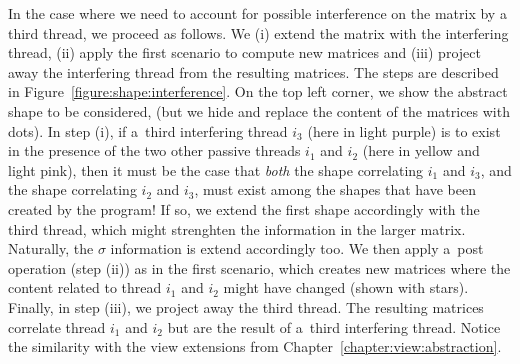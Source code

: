 %
%
%
In the case where we need to account for possible interference on the
matrix by a third thread, we proceed as follows.
%
We %
(i) extend the matrix with the interfering thread, %
(ii) apply the first scenario to compute new matrices and %
(iii) project away the interfering thread from the resulting matrices.
%
The steps are described in Figure~\ref{figure:shape:interference}.
%
On the top left corner, we show the abstract shape to be considered,
(but we hide and replace the content of the matrices with dots).
%
%
In step (i), if a~third interfering thread $i_3$ (here in light
purple) is to exist in the presence of the two other passive threads
$i_1$ and $i_2$ (here in yellow and light pink), then it must be the
case that \emph{both} the shape correlating $i_1$ and $i_3$, and the
shape correlating $i_2$ and $i_3$, must exist among the shapes that
have been created by the program!
%
If so, we extend the first shape accordingly with the third thread,
which might strenghten the information in the larger matrix.
%
Naturally, the $\sigma$ information is extend accordingly too.
%
We then apply a~post operation (step (ii)) as in the first scenario,
which creates new matrices where the content related to thread $i_1$
and $i_2$ might have changed (shown with stars).
%
Finally, in step (iii), we project away the third thread. The
resulting matrices correlate thread $i_1$ and $i_2$ but are the result
of a~third interfering thread.
%
Notice the similarity with the view extensions from
Chapter~\ref{chapter:view:abstraction}.

